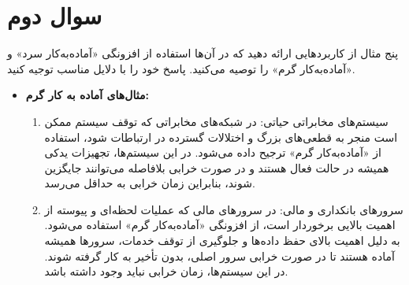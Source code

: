\section{سوال دوم}

پنج مثال از کاربردهایی ارائه دهید که در آن‌ها استفاده از افزونگی «آماده‌به‌کار سرد» و «آماده‌به‌کار گرم» را توصیه می‌کنید. پاسخ خود را با دلایل مناسب توجیه کنید.

\begin{qsolve}
	
	\begin{itemize}
		\item 
		\textbf{مثال‌های آماده به کار گرم:}\\
		\begin{enumerate}
			\item 
			سیستم‌های مخابراتی حیاتی: در شبکه‌های مخابراتی که توقف سیستم ممکن است منجر به قطعی‌های بزرگ و اختلالات گسترده در ارتباطات شود، استفاده از «آماده‌به‌کار گرم» ترجیح داده می‌شود. در این سیستم‌ها، تجهیزات یدکی همیشه در حالت فعال هستند و در صورت خرابی بلافاصله می‌توانند جایگزین شوند، بنابراین زمان خرابی به حداقل می‌رسد.
			
			
			
			\item 
			سرورهای بانکداری و مالی: در سرورهای مالی که عملیات لحظه‌ای و پیوسته از اهمیت بالایی برخوردار است، از افزونگی «آماده‌به‌کار گرم» استفاده می‌شود. به دلیل اهمیت بالای حفظ داده‌ها و جلوگیری از توقف خدمات، سرورها همیشه آماده هستند تا در صورت خرابی سرور اصلی، بدون تأخیر به کار گرفته شوند. در این سیستم‌ها، زمان خرابی نباید وجود داشته باشد.
		\end{enumerate}
	\end{itemize}
\end{qsolve}



%	



